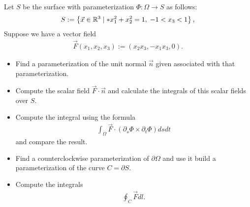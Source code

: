\documentclass[11pt]{article}
\begin{document}
\begin{exercise} %
    Let $S$ be the surface with parameterization $\Phi : \Omega \to S$ as follows:
    \begin{align*}
     S := \left\{ \vec x \in \bbR^3 \suchthat* x_1^2 + x_2^2 = 1, \; -1 < x_3 < 1 \right\},
    \end{align*}
    Suppose we have a vector field 
    \begin{align*}
        \vec F(x_1,x_2,x_3) := (x_2 x_3, -x_1 x_3, 0 ).
    \end{align*}
    \begin{itemize}
    \item
     Find a parameterization of the unit normal $\vec n$ given associated with that parameterization.
    \item
     Compute the scalar field $\vec F \cdot \vec n$ and calculate the integrals of this scalar fields over $S$.
    \item
     Compute the integral using the formula 
     \begin{align*}
        \int_\Omega \vec F \cdot ( \partial_s \Phi \times \partial_t \Phi ) dsdt
     \end{align*}
     and compare the result. 
    \item 
     Find a counterclockwise parameterization of $\partial\Omega$ and use it build a parameterization of the curve $C = \partial S$.
    \item 
     Compute the integrals 
     \begin{align*}
        \oint_C \vec F dl.
     \end{align*}

    \end{itemize}
\end{exercise}
\end{document}

